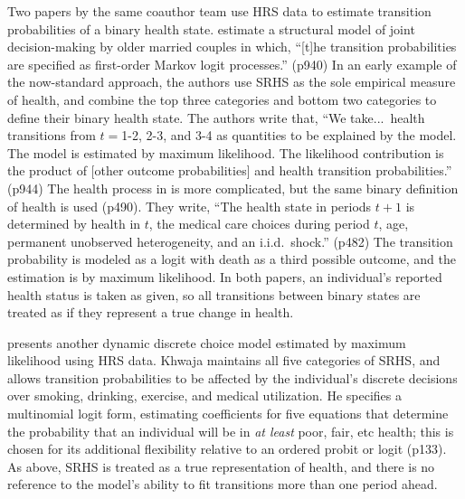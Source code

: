 \documentclass[12pt,pdftex,letterpaper]{article}
\begin{document}
Two papers by the same coauthor team use HRS data to estimate transition probabilities of a binary health state.  \cite{BlauGilleskie06} estimate a structural model of joint decision-making by older married couples in which, ``[t]he transition probabilities are specified as first-order Markov logit processes.'' (p940)  In an early example of the now-standard approach, the authors use SRHS as the sole empirical measure of health, and combine the top three categories and bottom two categories to define their binary health state.  The authors write that, ``We take...\ health transitions from $t=$1-2, 2-3, and 3-4 as quantities to be explained by the model.  The model is estimated by maximum likelihood. The likelihood contribution is the product of [other outcome probabilities] and health transition probabilities.'' (p944)  The health process in \cite{BlauGilleskie08} is more complicated, but the same binary definition of health is used (p490).  They write, ``The health state in periods $t+1$ is determined by health in $t$, the medical care choices during period $t$, age, permanent unobserved heterogeneity, and an i.i.d.\ shock.'' (p482)  The transition probability is modeled as a logit with death as a third possible outcome, and the estimation is by maximum likelihood.  In both papers, an individual's reported health status is taken as given, so all transitions between binary states are treated as if they represent a true change in health.

\cite{Khwaja10} presents another dynamic discrete choice model estimated by maximum likelihood using HRS data.  Khwaja maintains all five categories of SRHS, and allows transition probabilities to be affected by the individual's discrete decisions over smoking, drinking, exercise, and medical utilization.  He specifies a multinomial logit form, estimating coefficients for five equations that determine the probability that an individual will be in \textit{at least} poor, fair, etc health; this is chosen for its additional flexibility relative to an ordered probit or logit (p133).  As above, SRHS is treated as a true representation of health, and there is no reference to the model's ability to fit transitions more than one period ahead.
\end{document}
